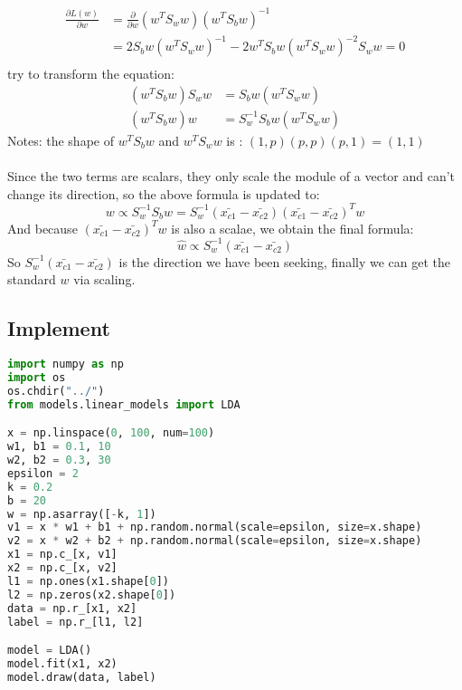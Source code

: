 \documentclass{report}
\begin{document}
\begin{equation}
\begin{aligned}
\frac{\partial{L(w)}}{\partial{w}}
&=\frac{\partial}{\partial{w}}(w^T S_w w)(w^T S_b w)^{-1}\\
&=2S_{b} w\left(w^{T} S_{w} w\right)^{-1}-2 w^{T} S_{b} w\left(w^{T} S_{w} w\right)^{-2} S_{w} w=0\\
\end{aligned} \end{equation}
try to transform the equation:
$$
\begin{aligned}
\left(w^{T} S_{b} w\right) S_{w} w&=S_{b} w\left(w^{T} S_{w} w\right)\\
\left(w^{T} S_{b} w\right) w&=S_{w}^{-1}S_{b} w\left(w^{T} S_{w} w\right)
\end{aligned}
$$
Notes: the shape of $w^T S_b w$ and $w^T S_w w$ is : $(1,p)(p,p) (p,1)=(1,1)$\\\\
Since the two terms are scalars, they only scale the module of a vector and can't change its direction, so the above formula is updated to:
$$
w \propto S_{w}^{-1} S_{b} w=S_{w}^{-1}\left(\bar{x_{c 1}}-\bar{x_{c 2}}\right)\left(\bar{x_{c 1}}-\bar{x_{c 2}}\right)^{T} w 
$$
And because $\left(\bar{x_{c 1}}-\bar{x_{c 2}}\right)^{T} w$ is also a scalae, we obtain the final formula:
$$
\hat{w}\propto S_{w}^{-1}\left(\bar{x_{c 1}}-\bar{x_{c 2}}\right)
$$
So $S_{w}^{-1}\left(\bar{x_{c 1}}-\bar{x_{c 2}}\right)$ is the direction we have been seeking, finally we can get the standard $w$ via scaling.
\newpage
\subsection{Implement}
\begin{lstlisting}[language={python}]
import numpy as np
import os
os.chdir("../")
from models.linear_models import LDA

x = np.linspace(0, 100, num=100)
w1, b1 = 0.1, 10
w2, b2 = 0.3, 30
epsilon = 2
k = 0.2
b = 20
w = np.asarray([-k, 1])
v1 = x * w1 + b1 + np.random.normal(scale=epsilon, size=x.shape)
v2 = x * w2 + b2 + np.random.normal(scale=epsilon, size=x.shape)
x1 = np.c_[x, v1]
x2 = np.c_[x, v2]
l1 = np.ones(x1.shape[0])
l2 = np.zeros(x2.shape[0])
data = np.r_[x1, x2]
label = np.r_[l1, l2]

model = LDA()
model.fit(x1, x2)
model.draw(data, label)
\end{lstlisting}
\end{document}
